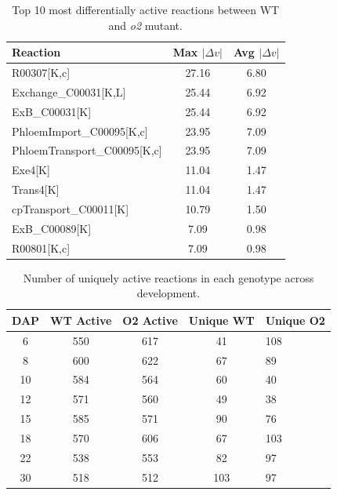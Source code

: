 \documentclass[11pt,letterpaper]{article}
\begin{document}
\clearpage

\begin{table}[H]
\centering
\caption{Top 10 most differentially active reactions between WT and \textit{o2} mutant.}
\label{stab:top_diff}
\small
\begin{tabular}{lcc}
\toprule
Reaction & Max $|\Delta v|$ & Avg $|\Delta v|$ \\
\midrule
R00307[K,c]                   & 27.16 & 6.80 \\
Exchange\_C00031[K,L]         & 25.44 & 6.92 \\
ExB\_C00031[K]                & 25.44 & 6.92 \\
PhloemImport\_C00095[K,c]     & 23.95 & 7.09 \\
PhloemTransport\_C00095[K,c]  & 23.95 & 7.09 \\
Exe4[K]                       & 11.04 & 1.47 \\
Trans4[K]                     & 11.04 & 1.47 \\
cpTransport\_C00011[K]        & 10.79 & 1.50 \\
ExB\_C00089[K]                & 7.09  & 0.98 \\
R00801[K,c]                   & 7.09  & 0.98 \\
\bottomrule
\end{tabular}
\end{table}

\clearpage

\begin{table}[H]
\centering
\caption{Number of uniquely active reactions in each genotype across development.}
\label{stab:unique}
\begin{tabular}{ccccl}
\toprule
DAP & WT Active & O2 Active & Unique WT & Unique O2 \\
\midrule
6  & 550 & 617 & 41  & 108 \\
8  & 600 & 622 & 67  & 89  \\
10 & 584 & 564 & 60  & 40  \\
12 & 571 & 560 & 49  & 38  \\
15 & 585 & 571 & 90  & 76  \\
18 & 570 & 606 & 67  & 103 \\
22 & 538 & 553 & 82  & 97  \\
30 & 518 & 512 & 103 & 97  \\
\bottomrule
\end{tabular}
\end{table}

\clearpage
\end{document}

